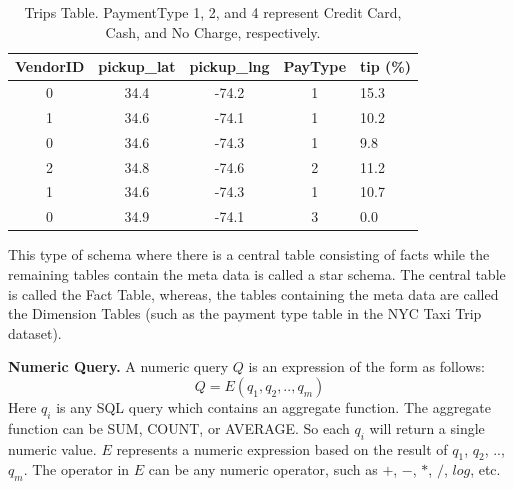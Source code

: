 \begin{table}
\small
\centering
\caption{\small Trips Table. PaymentType 1, 2, and 4 represent Credit Card, Cash, and No Charge, respectively.}
  \begin{tabular}{| c | c | c | c | l |}
    \hline
    {\bf VendorID} & \textbf{pickup\_lat} & \textbf{pickup\_lng} & \textbf{PayType} & \textbf{tip (\%)} \\ \hline
    0 & 34.4 & -74.2 & 1 & 15.3 \\ \hline
    1 & 34.6 & -74.1 & 1 & 10.2 \\ \hline
    0 & 34.6 & -74.3 & 1 & 9.8 \\ \hline
    2 & 34.8 & -74.6 & 2 & 11.2 \\ \hline
    1 & 34.6 & -74.3 & 1 & 10.7 \\ \hline
    0 & 34.9 & -74.1 & 3 & 0.0 \\
    \hline
  \end{tabular}
  \label{tbl:fact}
\end{table}

This type of schema where there is a central table consisting of facts while the remaining tables contain the meta data is called a star schema. The central table is called the Fact Table, whereas, the tables containing the meta data are called the Dimension Tables (such as the payment type table in the NYC Taxi Trip dataset).%



{\bf Numeric Query.} A numeric query $Q$ is an expression of the form as follows:
$$Q = E(q_1, q_2, .., q_m)$$
Here $q_i$ is any SQL query which contains an aggregate function. The aggregate function can be SUM, COUNT, or AVERAGE. So each $q_i$ will return a single numeric value. $E$ represents a numeric expression based on the result of $q_1$, $q_2$, .., $q_m$. The operator in $E$ can be any numeric operator, such as $+$, $-$, $*$, $/$, $log$, etc.

